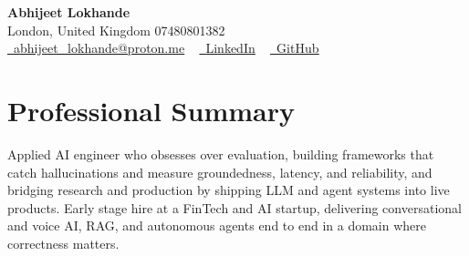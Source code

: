 \documentclass[a4paper,10pt]{article}
\begin{document}
    \begin{center}
        {\Huge\bfseries Abhijeet Lokhande}
        \\[2pt] {\color{muted}London, United Kingdom \textbar{} 07480801382}\\
        \small
        \href{mailto:abhijeet_lokhande@proton.me}{\raisebox{-0.2\height}{\color{primary}\faEnvelope}\  \underline{abhijeet\_lokhande@proton.me}} ~
        \href{https://www.linkedin.com/in/ablds/}{\raisebox{-0.2\height}{\color{primary}\faLinkedin}\ \underline{LinkedIn}}  ~
        \href{https://github.com/abhijeetscode}{\raisebox{-0.2\height}{\color{primary}\faGithub}\ \underline{GitHub}}
    \end{center}

\section{Professional Summary}
\vspace{-5pt}
{\color{muted}Applied AI engineer who obsesses over evaluation, building frameworks that catch hallucinations and measure groundedness, latency, and reliability, and bridging research and production by shipping LLM and agent systems into live products. Early stage hire at a FinTech and AI startup, delivering conversational and voice AI, RAG, and autonomous agents end to end in a domain where correctness matters.}
\vspace{2pt}

\end{document}
